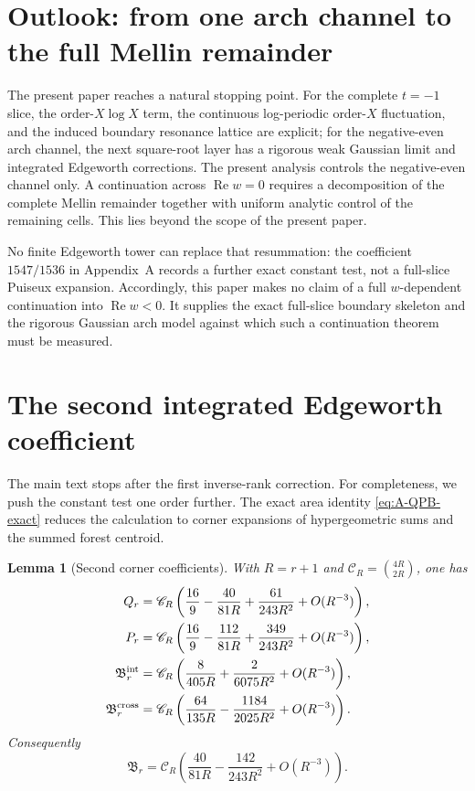 \documentclass[11pt]{article}
\newtheorem{lemma}[theorem]{Lemma}
\theoremstyle{definition}
\theoremstyle{remark}
\newcommand{\RePart}{\operatorname{Re}}
\begin{document}
\section{Outlook: from one arch channel to the full Mellin remainder}
\label{sec:outlook}

The present paper reaches a natural stopping point.  For the complete
$t=-1$ slice, the order-$X\log X$ term, the continuous log-periodic
order-$X$ fluctuation, and the induced boundary resonance lattice are
explicit; for the negative-even arch channel, the next square-root layer
has a rigorous weak Gaussian limit and integrated Edgeworth corrections.
The present analysis controls the negative-even channel only.  A
continuation across \(\RePart w=0\) requires a decomposition of the complete
Mellin remainder together with uniform analytic control of the remaining
cells.  This lies beyond the scope of the present paper.

No finite Edgeworth tower can replace that resummation: the coefficient
$1547/1536$ in Appendix~A records a further exact constant test, not a
full-slice Puiseux expansion.  Accordingly, this paper makes no claim of a
full $w$-dependent continuation into $\RePart w<0$.  It supplies the exact
full-slice boundary skeleton and the rigorous Gaussian arch model against
which such a continuation theorem must be measured.

\appendix

\section{The second integrated Edgeworth coefficient}
\label{subsec:second-flat-edgeworth}

The main text stops after the first inverse-rank correction.  For completeness, we push the constant test one order further.  The exact area identity \eqref{eq:A-QPB-exact} reduces the calculation to corner expansions of hypergeometric sums and the summed forest centroid.

\begin{lemma}[Second corner coefficients]
\label{lem:second-corner-coefficients}
With $R=r+1$ and $\mathscr C_R=\binom{4R}{2R}$, one has
\begin{align}
 Q_r
 &=\mathscr C_R\left(
 \frac{16}{9}-\frac{40}{81R}+\frac{61}{243R^2}
 +O(R^{-3})\right),
 \label{eq:Q-second-corner}\\
 P_r
 &=\mathscr C_R\left(
 \frac{16}{9}-\frac{112}{81R}+\frac{349}{243R^2}
 +O(R^{-3})\right),
 \label{eq:P-second-corner}\\
 \mathfrak B_r^{\rm int}
 &=\mathscr C_R\left(
 \frac{8}{405R}+\frac{2}{6075R^2}+O(R^{-3})\right),
 \label{eq:Bint-second-corner}\\
 \mathfrak B_r^{\rm cross}
 &=\mathscr C_R\left(
 \frac{64}{135R}-\frac{1184}{2025R^2}+O(R^{-3})\right).
 \label{eq:Bcross-second-corner}
\end{align}
Consequently
\begin{equation}
 {
 \mathfrak B_r
 =\mathscr C_R\left(
 \frac{40}{81R}-\frac{142}{243R^2}+O(R^{-3})\right).}
 \label{eq:B-second-corner}
\end{equation}
\end{lemma}
\end{document}
